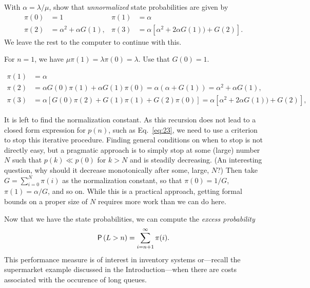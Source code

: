 \begin{exercise}\label{ex:13}
With $\alpha = \lambda/\mu$,  show that \emph{unnormalized} state probabilities are given by
\begin{align*}
\pi(0) & = 1 &
  \pi(1) &= \alpha \\
  \pi(2) &= \alpha^2 + \alpha G(1), &
  \pi(3) &= \alpha[ \alpha^2 + 2 \alpha G(1)) + G(2)].
\end{align*}
We leave the rest to the computer to continue with this.
\begin{hint}
For $n=1$, we have
$\mu \pi(1) = \lambda \pi(0)=\lambda$. Use that $G(0)=1$.
\end{hint}
\begin{solution}
\begin{equation*}
  \begin{split}
  \pi(1) &= \alpha \\
  \pi(2) &= \alpha G(0) \pi(1) + \alpha G(1) \pi(0) =\alpha(\alpha+ G(1)) = \alpha^2 + \alpha G(1), \\
  \pi(3) 
&= \alpha[G(0) \pi(2) + G(1) \pi(1) + G(2) \pi(0)]  = \alpha[ \alpha^2 + 2 \alpha G(1)) + G(2)],
  \end{split}
\end{equation*}
\end{solution}  
\end{exercise}

It is left to find the normalization constant.  As this recursion does
not lead to a closed form expression for $p(n)$, such as
Eq.~\eqref{eq:23}, we need to use a criterion to stop this iterative
procedure. Finding general conditions on when to stop is not directly
easy, but a pragmatic approach is to simply stop at some (large)
number $N$ such that $p(k)\ll p(0)$ for $k>N$ and is steadily decreasing. (An interesting question, why should it decrease monotonically after some, large, $N$?)
Then take $G=\sum_{i=0}^N \pi(i)$ as the normalization
constant, so that $\pi(0)=1/G$, $\pi(1)=\alpha/G$, and so on.
While this is a practical approach, getting formal bounds on a proper size of $N$ requires more work than we can do here.

Now that we have the state probabilities, we can compute the \emph{excess probability}
\begin{equation}
  \P{L> n } = \sum_{i=n+1}^\infty \pi(i).
\end{equation}
This performance measure is  of interest in inventory systems or---recall the supermarket example discussed in the Introduction---when there are costs associated with the occurence of long queues. 

